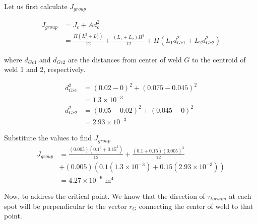 \documentclass[
10pt,
a4paper,
openany,
svgnames,
]{book}
\begin{document}
\begin{solution}
  Let us first calculate $J_{group}$

  \begin{align*}
    J_{group} &= J_c + A d_o^2 \\
              &= \frac{H(L_1^3 + L_2^3)}{12} +\frac{(L_1 + L_2)H^3}{12} + H(L_1d_{Gc1}^2 + L_2d_{Gc2}^2)
  \end{align*}

  where $d_{Gc1}$ and $d_{Gc2}$ are the distances from center of weld $G$ to the centroid of weld 1 and 2, respectively.

  \begin{align*}
    d_{Gc1}^2 &= (0.02-0)^2+(0.075-0.045)^2 \\
              &= 1.3 \times 10^{-3} \\
    d_{Gc2}^2 &= (0.05-0.02)^2 + (0.045 - 0)^2 \\
              &= 2.93 \times 10^{-3}
  \end{align*}

  Substitute the values to find $J_{group}$
  \begin{align*}
    J_{group} &= \frac{(0.005)(0.1^3 + 0.15^3)}{12} +\frac{(0.1 + 0.15)(0.005)^3}{12} \\
              &+ (0.005)(0.1(1.3 \times 10^{-3}) + 0.15(2.93 \times 10^{-3})) \\
              &= 4.27 \times 10^{-6} \text{ m}^4
  \end{align*}

  Now, to address the critical point. We know that the direction of $\tau_{torsion}$ at each spot will be perpendicular to the vector $r_G$ connecting the center of weld to that point.

  \begin{center}
  \end{center}
  

\end{solution}
\end{document}

